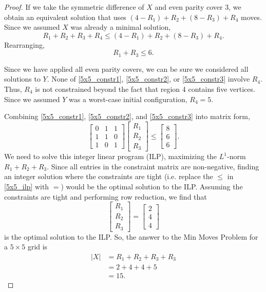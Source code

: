 \documentclass[a4paper]{article}
\newcommand{\abs}[1]{\left| #1 \right|}
\begin{document}
\begin{proof}
		If we take the symmetric difference of $X$ and even parity cover 3, we obtain an equivalent solution that uses $(4 - R_1) + R_2 + (8 - R_3) + R_4$ moves.
		Since we assumed $X$ was already a minimal solution,
		\begin{equation*}
			R_1 + R_2 + R_3 + R_4 \leq (4 - R_1) + R_2 + (8 - R_3) + R_4.
		\end{equation*}
		Rearranging,
		\begin{equation}\label{5x5_constr3}
			R_1 + R_3 \leq 6.
		\end{equation}
	
		Since we have applied all even parity covers, we can be sure we considered all solutions to $Y$.
		None of \eqref{5x5_constr1}, \eqref{5x5_constr2}, or \eqref{5x5_constr3} involve $R_4$.
		Thus, $R_4$ is not constrained beyond the fact that region 4 contains five vertices.
		Since we assumed $Y$ was a worst-case initial configuration, $R_4 = 5$.
	
		Combining \eqref{5x5_constr1}, \eqref{5x5_constr2}, and \eqref{5x5_constr3} into matrix form,
		\begin{equation}\label{5x5_ilp}
			\begin{bmatrix}
				0 & 1 & 1 \\
				1 & 1 & 0 \\
				1 & 0 & 1
			\end{bmatrix}
			\begin{bmatrix}
				R_1 \\
				R_2 \\
				R_3
			\end{bmatrix}
			\leq
			\begin{bmatrix}
				8 \\
				6 \\
				6
			\end{bmatrix}.
		\end{equation}
		We need to solve this integer linear program (ILP), maximizing the $L^1$-norm $R_1 + R_2 + R_3$.
		Since all entries in the constraint matrix are non-negative, finding an integer solution where the constraints are tight (i.e. replace the $\leq$ in \eqref{5x5_ilp} with $=$) would be the optimal solution to the ILP.
		Assuming the constraints are tight and performing row reduction, we find that
		\begin{equation*}
			\begin{bmatrix}
				R_1 \\
				R_2 \\
				R_3
			\end{bmatrix}
			=
			\begin{bmatrix}
				2 \\
				4 \\
				4
			\end{bmatrix}
		\end{equation*}
		is the optimal solution to the ILP.
		So, the answer to the Min Moves Problem for a $5 \times 5$ grid is 
		\begin{align*}
			\abs{X} &= R_1 + R_2 + R_3 + R_3 \\
				&= 2 + 4 + 4 + 5 \\
				&= 15.
		\end{align*}
	\end{proof}
\end{document}
